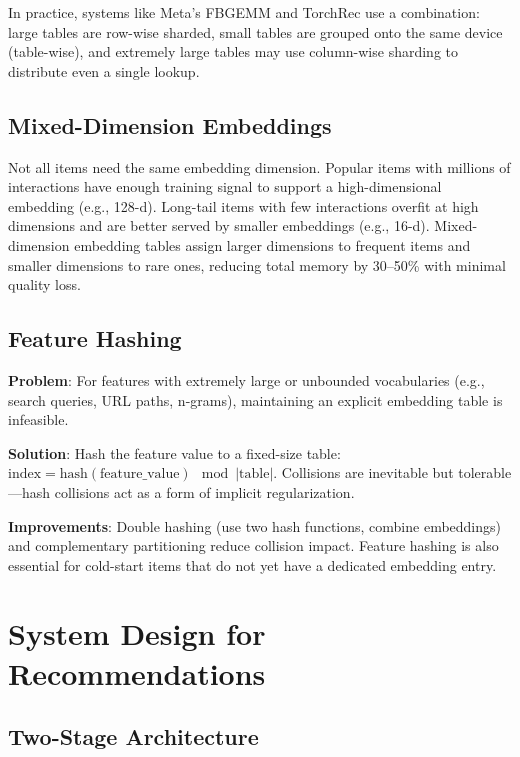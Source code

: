 In practice, systems like Meta's FBGEMM and TorchRec use a combination: large tables are row-wise sharded, small tables are grouped onto the same device (table-wise), and extremely large tables may use column-wise sharding to distribute even a single lookup.

\subsection{Mixed-Dimension Embeddings}

Not all items need the same embedding dimension. Popular items with millions of interactions have enough training signal to support a high-dimensional embedding (e.g., 128-d). Long-tail items with few interactions overfit at high dimensions and are better served by smaller embeddings (e.g., 16-d). Mixed-dimension embedding tables assign larger dimensions to frequent items and smaller dimensions to rare ones, reducing total memory by 30--50\% with minimal quality loss.

\subsection{Feature Hashing}

\textbf{Problem}: For features with extremely large or unbounded vocabularies (e.g., search queries, URL paths, n-grams), maintaining an explicit embedding table is infeasible.

\textbf{Solution}: Hash the feature value to a fixed-size table: $\text{index} = \text{hash}(\text{feature\_value}) \mod |\text{table}|$. Collisions are inevitable but tolerable---hash collisions act as a form of implicit regularization.

\textbf{Improvements}: Double hashing (use two hash functions, combine embeddings) and complementary partitioning reduce collision impact. Feature hashing is also essential for cold-start items that do not yet have a dedicated embedding entry.

\section{System Design for Recommendations}
\label{sr:sec:recsys_system}

\subsection{Two-Stage Architecture}

